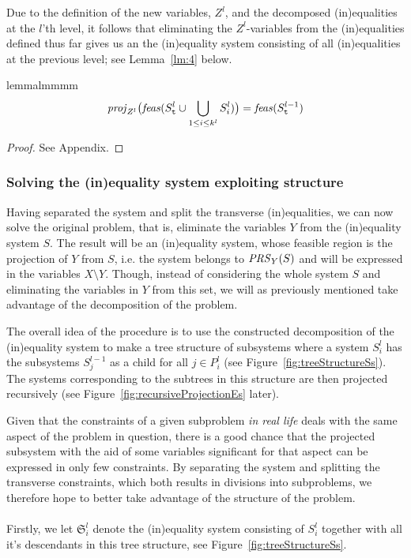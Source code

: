 Due to the definition of the new variables, $Z^l$, and the decomposed (in)equalities at the $l$'th level, it follows that eliminating the $Z^l$-variables from 
the (in)equalities defined thus far gives us an the (in)equality system consisting of all (in)equalities at the previous level; see Lemma~\ref{lm:4} below.

\begin{restatable}{lemma}{lmmmm}\label{lm:4}
\[
\mathit{proj}_{Z^l}\big(\mathit{feas}(S^l_{\texttt{t}}\cup\bigcup_{1\leq i\leq k^l}S^l_i)\big) = \mathit{feas}(S^{l-1}_{\texttt{t}})
\]
\end{restatable}
\begin{proof}
See Appendix.
\end{proof}
%
%
\subsubsection*{Solving the (in)equality system exploiting structure}
Having separated the system and split the transverse (in)equalities, we can now solve the original problem, that is, eliminate the variables $Y$ from the (in)equality system $S$. The result will be an (in)equality system, whose feasible region is the projection of $Y$ from $S$, i.e. the system belongs to $\mathit{PRS}_Y(S)$ and will be expressed in the variables $X\setminus Y$. Though, instead of considering the whole system $S$ and eliminating the variables in $Y$ from this set, we will as previously mentioned take advantage of the decomposition of the problem. 

The overall idea of the procedure is to use the constructed decomposition of the (in)equality system to make a tree structure of subsystems where a system $S^l_i$ has the subsystems $S^{l-1}_{j}$ as a child for all $j\in P^l_i$ (see Figure~\ref{fig:treeStructureSs}). The systems corresponding to the subtrees in this structure are then projected recursively (see Figure~\ref{fig:recursiveProjectionEs} later).

{Given that the constraints of a given subproblem \emph{in real life} deals with the same aspect of the problem in question, there is a good chance that the projected subsystem with the aid of some variables significant for that aspect can be expressed in only few constraints. By separating the system and splitting the transverse constraints, which both results in divisions into subproblems, we therefore hope to better take advantage of the structure of the problem.}
\\\\
Firstly, we let $\mathfrak{S}^l_i$ denote the (in)equality system consisting of $S^l_i$ together with all it's descendants in this tree structure, see Figure~\ref{fig:treeStructureSs}. 

